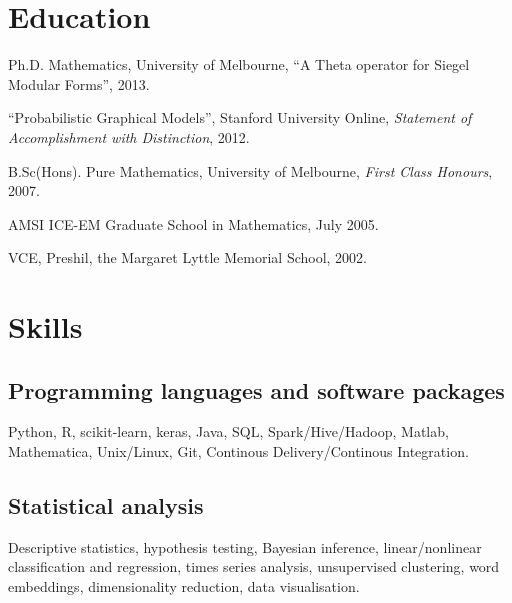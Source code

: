 \documentclass[10pt,a4paper]{article}
\renewenvironment{itemize}{
  \begin{list}{}{
    \setlength{\leftmargin}{1.5em}
    \setlength{\itemsep}{0.25em}
    \setlength{\parskip}{0pt}
    \setlength{\parsep}{0.25em}
  }
}{
  \end{list}
}
\begin{document}
\section*{Education}
\begin{itemize}
	\item Ph.D.  Mathematics, University of Melbourne, ``A Theta operator for Siegel Modular Forms'', 2013.
	\item ``Probabilistic Graphical Models'', Stanford University Online, \emph{Statement of Accomplishment with Distinction}, 2012.
	\item B.Sc(Hons). Pure Mathematics, University of Melbourne, \emph{First Class Honours}, 2007. 
	\item AMSI ICE-EM Graduate School in Mathematics, July 2005. 
	\item VCE, Preshil, the Margaret Lyttle Memorial School, 2002.
\end{itemize}

\section*{Skills}



\subsection*{Programming languages and software packages}
\begin{itemize}
\item Python, R, scikit-learn, keras, Java, SQL, Spark/Hive/Hadoop, Matlab, Mathematica, Unix/Linux, Git, Continous Delivery/Continous Integration.
\end{itemize}

\subsection*{Statistical analysis}
\begin{itemize}
\item Descriptive statistics, hypothesis testing, Bayesian inference, linear/nonlinear classification and regression, times series analysis, unsupervised clustering, word embeddings, dimensionality reduction, data visualisation. 
\end{itemize}
\end{document}
